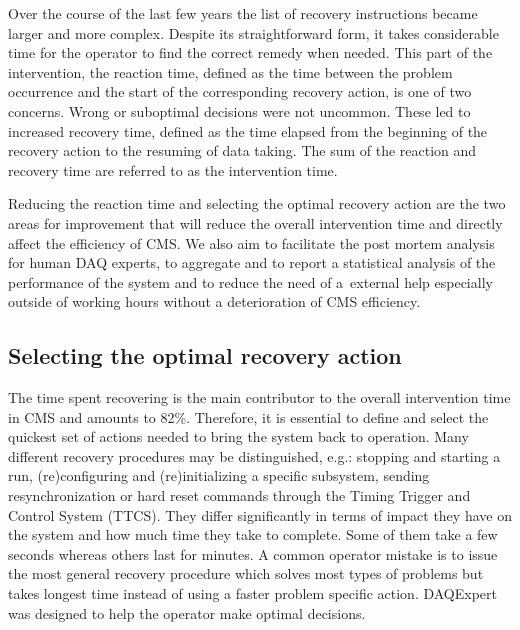 \documentclass[a4paper]{jpconf}
\begin{document}
Over the course of the last few years the list of recovery instructions became larger and more complex. Despite its straightforward form, it takes considerable time for the operator to find the correct remedy when needed. This part of the intervention, the reaction time, defined as the time between the problem occurrence and the start of the corresponding recovery action, is one of two concerns. Wrong or suboptimal decisions were not uncommon. These led to increased recovery time, defined as the time elapsed from the beginning of the recovery action to the resuming of data taking. The sum of the reaction and recovery time are referred to as the intervention time.

Reducing the reaction time and selecting the optimal recovery action are the two areas for improvement that will reduce the overall intervention time and directly affect the efficiency of CMS. We also aim to facilitate the post mortem analysis for human DAQ experts, to aggregate and to report a statistical analysis of the performance of the system and to reduce the need of a~external help especially outside of working hours without a deterioration of CMS efficiency. 

\subsection{Selecting the optimal recovery action}
The time spent recovering is the main contributor to the overall intervention time in CMS and amounts to 82\%. Therefore, it is essential to define and select the quickest set of actions needed to bring the system back to operation. Many different recovery procedures may be distinguished, e.g.: stopping and starting a run, (re)configuring and (re)initializing a specific subsystem, sending resynchronization or hard reset commands through the Timing Trigger and Control System (TTCS). They differ significantly in terms of impact they have on the system and how much time they take to complete. Some of them take a few seconds whereas others last for minutes. A common operator mistake is to issue the most general recovery procedure which solves most types of problems but takes longest time instead of using a faster problem specific action. DAQExpert was designed to help the operator make optimal decisions.
\end{document}

